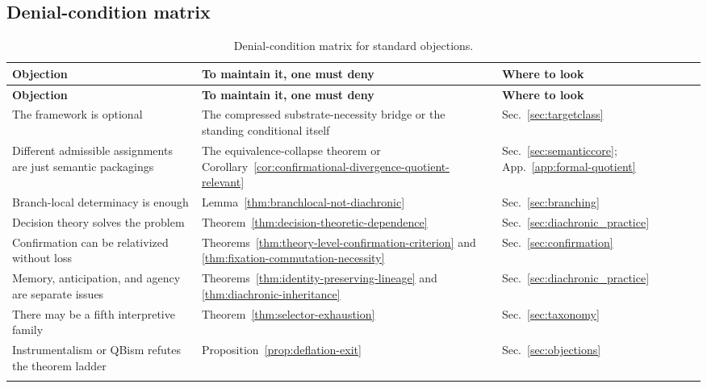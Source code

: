 \subsection{Denial-condition matrix}

\begin{longtable}{>{\raggedright\arraybackslash}p{} >{\raggedright\arraybackslash}p{} >{\raggedright\arraybackslash}p{}}
\caption{Denial-condition matrix for standard objections.}\\
\toprule
\textbf{Objection} & \textbf{To maintain it, one must deny} & \textbf{Where to look} \\
\midrule
\endfirsthead
\toprule
\textbf{Objection} & \textbf{To maintain it, one must deny} & \textbf{Where to look} \\
\midrule
\endhead
The framework is optional & The compressed substrate-necessity bridge or the standing conditional itself & Sec.~\ref{sec:targetclass} \\
\addlinespace
Different admissible assignments are just semantic packagings & The equivalence-collapse theorem or Corollary~\ref{cor:confirmational-divergence-quotient-relevant} & Sec.~\ref{sec:semanticcore}; App.~\ref{app:formal-quotient} \\
\addlinespace
Branch-local determinacy is enough & Lemma~\ref{thm:branchlocal-not-diachronic} & Sec.~\ref{sec:branching} \\
\addlinespace
Decision theory solves the problem & Theorem~\ref{thm:decision-theoretic-dependence} & Sec.~\ref{sec:diachronic_practice} \\
\addlinespace
Confirmation can be relativized without loss & Theorems~\ref{thm:theory-level-confirmation-criterion} and \ref{thm:fixation-commutation-necessity} & Sec.~\ref{sec:confirmation} \\
\addlinespace
Memory, anticipation, and agency are separate issues & Theorems~\ref{thm:identity-preserving-lineage} and \ref{thm:diachronic-inheritance} & Sec.~\ref{sec:diachronic_practice} \\
\addlinespace
There may be a fifth interpretive family & Theorem~\ref{thm:selector-exhaustion} & Sec.~\ref{sec:taxonomy} \\
\addlinespace
Instrumentalism or QBism refutes the theorem ladder & Proposition~\ref{prop:deflation-exit} & Sec.~\ref{sec:objections} \\
\bottomrule
\label{tab:attack-map}
\end{longtable}

